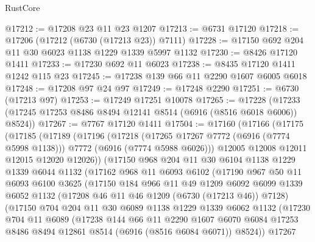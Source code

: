 \begin{lexlean}{RustCore}
\begin{coremodule}
@17212 := @17208 @23 @11 @23 @1207
@17213 := @6731 @17120
@17218 := @17206 (@17212 (@6730 (@17213 @23)) @7111)
@17228 := @17150 @692 @204 @11 @30 @6023 @1138 @1229 @1339 @5997 @1132
@17230 := @8426 @17120 @1411
@17233 := @17230 @692 @11 @6023
@17238 := @8435 @17120 @1411 @1242 @115 @23
@17245 := @17238 @139 @66 @11 @2290 @1607 @6005 @6018
@17248 := @17208 @97 @24 @97
@17249 := @17248 @2290
@17251 := @6730 (@17213 @97)
@17253 := @17249 @17251 @10078
@17265 := @17228 (@17233 (@17245 @17253 @8486 @8494 @12141 @8514 (@6916 (@8516 @6018 @6006)) @8524))
@17267 := @7767 @17120 @1411
@17504 := @17160
    (@17166
      (@17175
        (@17185
          (@17189
            (@17196
              (@17218
                (@17265 @17267 @7772 (@6916 (@7774 @5998 @1138)))
                @7772
                (@6916 (@7774 @5988 @6026)))
              @12005
              @12008
              @12011
              @12015
              @12020
              @12026))
          (@17150
            @968
            @204
            @11
            @30
            @6104
            @1138
            @1229
            @1339
            @6044
            @1132
            (@17162
              @968
              @11
              @6093
              @6102
              (@17190
                @967
                @50
                @11
                @6093
                @6100
                @3625
                (@17150
                  @184
                  @966
                  @11
                  @49
                  @1209
                  @6092
                  @6099
                  @1339
                  @6052
                  @1132
                  (@17208 @46 @11 @46 @1209 (@6730 (@17213 @46)) @7128)
                  (@17150
                    @704
                    @204
                    @11
                    @30
                    @6089
                    @1138
                    @1229
                    @1339
                    @6062
                    @1132
                    (@17230
                      @704
                      @11
                      @6089
                      (@17238
                        @144
                        @66
                        @11
                        @2290
                        @1607
                        @6070
                        @6084
                        @17253
                        @8486
                        @8494
                        @12861
                        @8514
                        (@6916 (@8516 @6084 @6071))
                        @8524))
                    @17267

\end{coremodule}
\end{lexlean}
